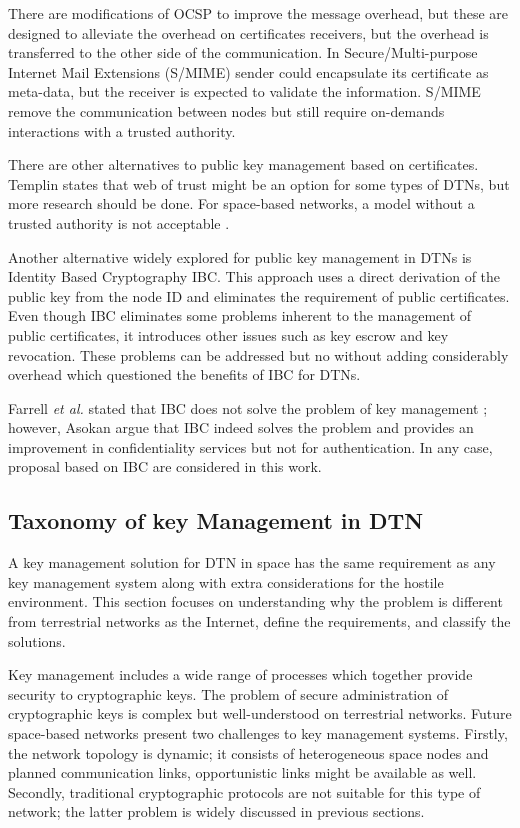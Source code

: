 There are modifications of OCSP to improve the message overhead, but these are designed to alleviate the overhead on certificates receivers, but the overhead is transferred to the other side of the communication. In Secure/Multi-purpose Internet Mail Extensions (S/MIME) sender could encapsulate its certificate as meta-data, but the receiver is expected to validate the information. S/MIME remove the communication between nodes but still require on-demands interactions with a trusted authority. 

There are other alternatives to public key management based on certificates. Templin \cite{templin-dtnskmps-00} states that web of trust might be an option for some types of DTNs, but more research should be done. For space-based networks, a model without a trusted authority is not acceptable \cite{viswanathan-dtn-pkdn-00,burleigh-dtnwg-dtka-01,ivancic2009security}.  

Another alternative widely explored for public key management in DTNs is Identity Based Cryptography IBC. This approach uses a direct derivation of the public key from the node ID and eliminates the requirement of public certificates.  Even though IBC eliminates some problems inherent to the management of public certificates, it introduces other issues such as key escrow and key revocation. These problems can be addressed but no without adding considerably overhead which questioned the benefits of IBC for DTNs.


Farrell \textit{et al.} stated that IBC does not solve the problem of key management \cite{irtf-dtnrg-sec-overview-06}; however, Asokan \cite{asokan2007towards} argue that IBC indeed solves the problem and provides an improvement in confidentiality services but not for authentication. In any case, proposal based on IBC are considered in this work.   


\subsection{Taxonomy of key Management in DTN}

A key management solution for DTN in space has the same requirement as any key management system along with extra considerations for the hostile environment. This section focuses on understanding why the problem is different from terrestrial networks as the Internet, define the requirements, and classify the solutions. 



Key management includes a wide range of processes which together provide security to cryptographic keys.  The problem of secure administration of cryptographic keys is complex but well-understood on terrestrial networks. Future space-based networks present two challenges to key management systems. Firstly, the network topology is dynamic; it consists of heterogeneous space nodes and planned communication links, opportunistic links might be available as well. Secondly, traditional cryptographic protocols are not suitable for this type of network; the latter problem is widely discussed in previous sections.%

